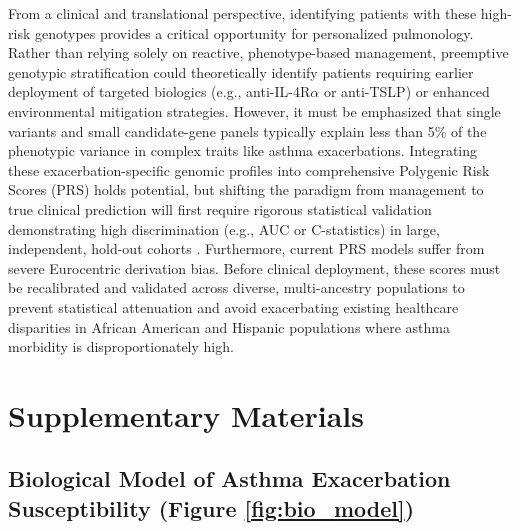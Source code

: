 \documentclass[11pt,a4paper]{article}
\begin{document}
From a clinical and translational perspective, identifying patients with these high-risk genotypes provides a critical opportunity for personalized pulmonology. Rather than relying solely on reactive, phenotype-based management, preemptive genotypic stratification could theoretically identify patients requiring earlier deployment of targeted biologics (e.g., anti-IL-4R$\alpha$ or anti-TSLP) or enhanced environmental mitigation strategies. However, it must be emphasized that single variants and small candidate-gene panels typically explain less than 5\% of the phenotypic variance in complex traits like asthma exacerbations. Integrating these exacerbation-specific genomic profiles into comprehensive Polygenic Risk Scores (PRS) holds potential, but shifting the paradigm from management to true clinical prediction will first require rigorous statistical validation demonstrating high discrimination (e.g., AUC or C-statistics) in large, independent, hold-out cohorts \cite{TseKrajinovic2019, ShiZhang2022}. Furthermore, current PRS models suffer from severe Eurocentric derivation bias. Before clinical deployment, these scores must be recalibrated and validated across diverse, multi-ancestry populations to prevent statistical attenuation and avoid exacerbating existing healthcare disparities in African American and Hispanic populations where asthma morbidity is disproportionately high.

\clearpage
\section*{Supplementary Materials}

\subsection*{Biological Model of Asthma Exacerbation Susceptibility (Figure \ref{fig:bio_model})}
\end{document}
